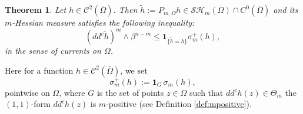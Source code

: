 \documentclass[JEP,XML,SOM,Unicode]{cedram}
\newtheorem{theorem}{Theorem}[section]
\theoremstyle{definition}
\newcommand{\Cc}{\mathcal{C}}
\begin{document}

\begin{theorem} \label{thm:obstacle}
Let $h \in \Cc^2 ({\bar{\Omega}})$. Then $\tilde h:= P_{m,\Omega} h \in \mathcal{SH}_m (\Omega) \cap C^0 (\bar \Omega)$ and its $m$\nobreakdash-Hessian measure satisfies the following inequality:
\begin{equation} \label{eq:BerIneq1}
(dd^c \tilde h)^m \wedge \beta^{n - m} \leq \mathbf{1}_{\{ \tilde h = h\}} \sigma_m^+ (h),
\end{equation}
in the sense of currents on $\Omega$.
\end{theorem}
Here for a function $h \in \Cc^2 ({\bar{\Omega}})$, we set
\[
\sigma_m^+ (h):= \mathbf{1}_G \, \sigma_m (h),
\]
pointwise on $\Omega$, where $G$ is the set of points $z \in \Omega$ such that $dd^c h (z) \in \Theta_m$ \ie the $(1,1)$-form $dd^c h (z)$ is $m$-positive (see Definition \ref{def:mpositive}).
\end{document}

